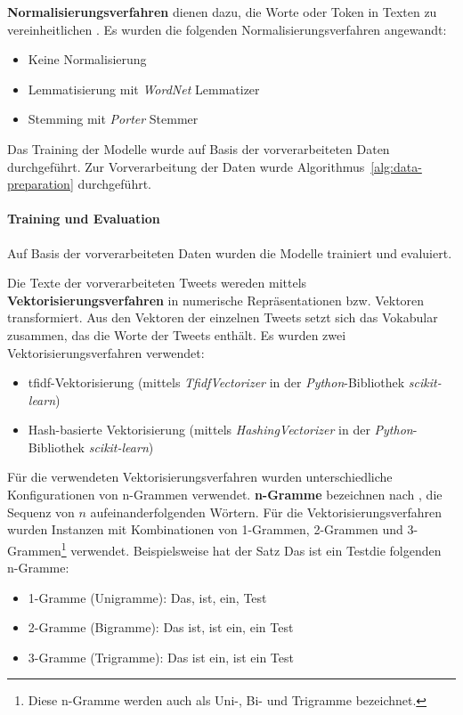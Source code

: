 \textbf{Normalisierungsverfahren} dienen dazu, die Worte oder Token in Texten zu vereinheitlichen \cite[S.28]{manning2009introduction}.
Es wurden die folgenden Normalisierungsverfahren angewandt:
\begin{itemize}
    \item Keine Normalisierung
    \item Lemmatisierung mit \textit{WordNet} Lemmatizer
    \item Stemming mit \textit{Porter} Stemmer
\end{itemize}

Das Training der Modelle wurde auf Basis der vorverarbeiteten Daten durchgeführt.
Zur Vorverarbeitung der Daten wurde Algorithmus~\ref{alg:data-preparation} durchgeführt.

\paragraph{Training und Evaluation}
Auf Basis der vorverarbeiteten Daten wurden die Modelle trainiert und evaluiert.

Die Texte der vorverarbeiteten Tweets wereden mittels \textbf{Vektorisierungsverfahren} in numerische Repräsentationen bzw. Vektoren transformiert.
Aus den Vektoren der einzelnen Tweets setzt sich das Vokabular zusammen, das die Worte der Tweets enthält.
Es wurden zwei Vektorisierungsverfahren verwendet:
\begin{itemize}
    \item \gls{tfidf}-Vektorisierung (mittels \textit{TfidfVectorizer} in der \textit{Python}-Bibliothek \textit{scikit-learn})
    \item Hash-basierte Vektorisierung (mittels \textit{HashingVectorizer} in der \textit{Python}-Bibliothek \textit{scikit-learn})
\end{itemize}
Für die verwendeten Vektorisierungsverfahren wurden unterschiedliche Konfigurationen von n-Grammen verwendet.
\textbf{n-Gramme} bezeichnen nach \cite[S.33]{jm3}, die Sequenz von $n$ aufeinanderfolgenden Wörtern.
Für die Vektorisierungsverfahren wurden Instanzen mit Kombinationen von 1-Grammen, 2-Grammen und 3-Grammen\footnote{Diese n-Gramme werden auch als Uni-, Bi- und Trigramme bezeichnet.} verwendet.
Beispielsweise hat der Satz \glqq Das ist ein Test\grqq  die folgenden n-Gramme:
\begin{itemize}
    \item 1-Gramme (Unigramme): \glqq Das\grqq, \glqq ist\grqq, \glqq ein\grqq, \glqq Test\grqq
    \item 2-Gramme (Bigramme): \glqq Das ist\grqq, \glqq ist ein\grqq, \glqq ein Test\grqq
    \item 3-Gramme (Trigramme): \glqq Das ist ein\grqq, \glqq ist ein Test\grqq
\end{itemize}

